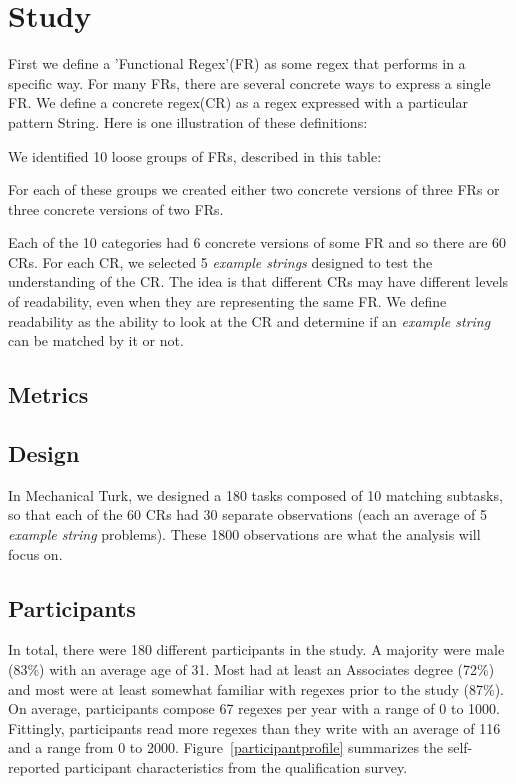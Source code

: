 
\section{Study}

First we define a 'Functional Regex'(FR) as some regex that performs in a specific way.  For many FRs, there are several concrete ways to express a single FR.
We define a concrete regex(CR) as a regex expressed with a particular pattern String.
Here is one illustration of these definitions:


We identified 10 loose groups of FRs, described in this table:


For each of these groups we created either two concrete versions of three FRs or three concrete versions of two FRs.

Each of the 10 categories had 6 concrete versions of some FR and so there are 60 CRs.  For each CR, we selected 5 \emph{example strings} designed to test the understanding of the CR.  The idea is that different CRs may have different levels of readability, even when they are representing the same FR.  We define readability as the ability to look at the CR and determine if an \emph{example string} can be matched by it or not.



\subsection{Metrics}




\subsection{Design}
In Mechanical Turk, we designed a 180 tasks composed of 10 matching subtasks, so that each of the 60 CRs had 30 separate observations (each an average of 5 \emph{example string} problems).  These 1800 observations are what the analysis will focus on.


\subsection{Participants}
In total, there were 180 different participants in the study. A majority were male (83\%) with an average age of 31. Most had
at least an Associates degree (72\%) and most were at least somewhat familiar with regexes prior to the study (87\%). On average, 
participants compose 67 regexes per year with a range of 0 to 1000. Fittingly, participants read more regexes than they write with an average of 116 and a range from 0 to 2000. Figure~\ref{participantprofile} summarizes the self-reported participant characteristics from the qualification survey. 


